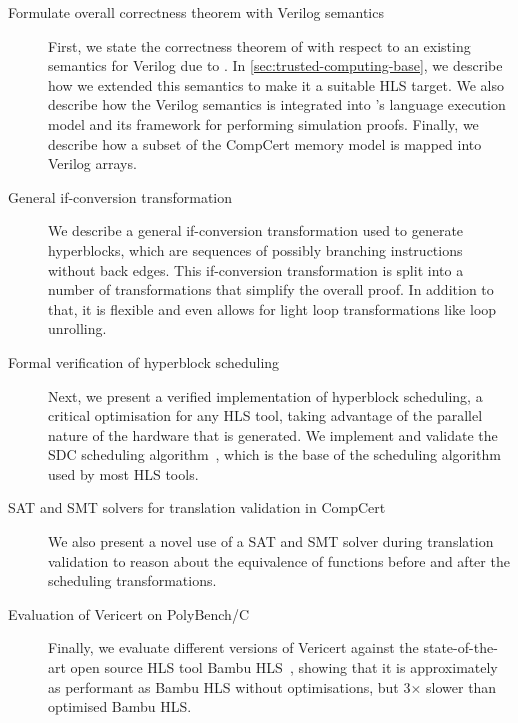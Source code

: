 \begin{description}
\item[Formulate overall correctness theorem with Verilog semantics] First, we
  state the correctness theorem of \vericert{} with respect to an existing
  semantics for Verilog due to \textcite{lööw19_proof_trans_veril_devel_hol}. In
  \cref{sec:trusted-computing-base}, we describe how we extended this semantics
  to make it a suitable \gls{HLS} target.  We also describe how the Verilog
  semantics is integrated into \compcert{}'s language execution model and its
  framework for performing simulation proofs.  Finally, we describe how a subset
  of the \gls{CompCert} memory model is mapped into Verilog arrays.

\item[General if-conversion transformation] We describe a general if-conversion
  transformation used to generate hyperblocks, which are sequences of possibly
  branching instructions without back edges.  This if-conversion transformation
  is split into a number of transformations that simplify the overall proof.  In
  addition to that, it is flexible and even allows for light loop
  transformations like loop unrolling.

\item[Formal verification of hyperblock scheduling] Next, we present a verified
  implementation of hyperblock scheduling, a critical optimisation for any
  \gls{HLS} tool, taking advantage of the parallel nature of the hardware that
  is generated.  We implement and validate the \gls{SDC} scheduling
  algorithm~\cite{cong06_sdc}, which is the base of the scheduling algorithm
  used by most \gls{HLS} tools.

\item[SAT and SMT solvers for translation validation in CompCert] We also
  present a novel use of a SAT and SMT solver during translation validation to
  reason about the equivalence of functions before and after the scheduling
  transformations.


\item[Evaluation of Vericert on PolyBench/C] Finally, we evaluate different
  versions of Vericert against the state-of-the-art open source \gls{HLS} tool
  Bambu HLS~\cite{pilato13_bambu}, showing that it is approximately as
  performant as Bambu HLS without optimisations, but 3$\times$ slower than
  optimised Bambu HLS.
\end{description}

